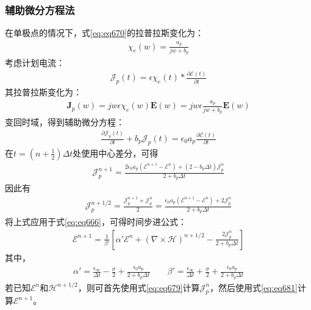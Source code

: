 \documentclass{article}
\numberwithin{equation}{section}
\renewcommand{\vec}[1]{\boldsymbol{#1}}
\begin{document}
\subsubsection{辅助微分方程法}
在单极点的情况下，式\ref{eq:eq670}的拉普拉斯变化为：
\begin{align}
    \label{eq:eq675}
    \chi_e(w)=\frac{a_p}{jw+b_p}
\end{align}
考虑计划电流：
\begin{align}
    \label{eq:eq676}
    \vec{\mathcal{J}}_p(t)=\epsilon\chi_e(t)\ast \frac{\partial\vec{\mathcal{E}}(t)}{\partial t}
\end{align}
其拉普拉斯变化为：
\begin{align}
    \label{eq:eq677}
    \mathbf{J}_p(w)=jw\epsilon\chi_e(w)\mathbf{E}(w)=jw\epsilon\frac{a_p}{jw+b_p}\mathbf{E}(w)
\end{align}
变回时域，得到辅助微分方程：
\begin{align}
    \label{eq:eq678}
    \frac{\partial \vec{\mathcal{J}}_p(t)}{\partial t}+b_p\vec{\mathcal{J}}_p(t)=\epsilon_0a_p\frac{\partial \vec{\mathcal{E}}(t)}{\partial t}
\end{align}
在$t=\left(n+\frac{1}{2}\right)\Delta t$处使用中心差分，可得
\begin{align}
    \label{eq:eq679}
    \vec{\mathcal{J}}_p^{n+1}=\frac{2\epsilon_0a_p(\vec{\mathcal{E}}^{n+1}-\vec{\mathcal{E}}^{n})+(2-b_p\Delta t)\vec{\mathcal{J}}_p^{n}}{2+b_p\Delta t}
\end{align}
因此有
\begin{align}
    \label{eq:eq680}
    \vec{\mathcal{J}}_p^{n+1/2}=\frac{\vec{\mathcal{J}}_p^{n+1}+\vec{\mathcal{J}}_p^{n}}{2}=\frac{\epsilon_0a_p(\vec{\mathcal{E}}^{n+1}-\vec{\mathcal{E}}^{n})+2\vec{\mathcal{J}}_p^{n}}{2+b_p\Delta t}
\end{align}
将上式应用于式\ref{eq:eq666}，可得时间步进公式：
\begin{align}
    \label{eq:eq681}
    \vec{\mathcal{E}}^{n+1}=\frac{1}{\beta'}\left[\alpha'\vec{\mathcal{E}}^{n}+(\nabla\times\vec{\mathcal{H}})^{n+1/2}-\frac{2\vec{\mathcal{J}}_p^{n}}{2+b_p\Delta t}\right]
\end{align}
其中，
\begin{align}
    \label{eq:eq682}
    \alpha'=\frac{\epsilon_{\infty}}{\Delta t}-\frac{\sigma}{2}+\frac{\epsilon_0a_p}{2+b_p\Delta t}\qquad\beta'=\frac{\epsilon_{\infty}}{\Delta t}+\frac{\sigma}{2}+\frac{\epsilon_0a_p}{2+b_p\Delta t}
\end{align}
若已知$\vec{\mathcal{E}}^{n}$和$\vec{\mathcal{H}}^{n+1/2}$，则可首先使用式\ref{eq:eq679}计算$\vec{\mathcal{J}}_p^{n}$，然后使用式\ref{eq:eq681}计算$\vec{\mathcal{E}}^{n+1}$。\par
\end{document}
